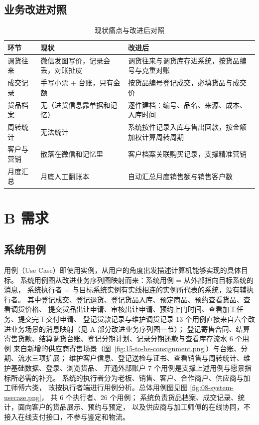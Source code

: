 \documentclass[12pt, a4paper]{ctexart}
\begin{document}
\subsection{业务改进对照}

\begin{table}[H]
\centering
\caption{现状痛点与改进后对照}
\begin{tabularx}{\textwidth}{@{}p{3.2cm} X X@{}}
\toprule
环节 & 现状 & 改进后 \\
\midrule
调货往来 & 微信发图写价，记录会丢，对账扯皮 & 调货往来与调货库存进系统，按货品编号与克重对账 \\
成交记录 & 手写小票 + 台账，只有金额 & 按货品编号登记成交，必填货品与成交价 \\
货品档案 & 无（进货信息靠单据和记忆） & 逐件建档：编号、品名、来源、成本、入库时间 \\
周转统计 & 无法统计 & 系统按件记录入库与售出回款，按金额加权计算周转周期 \\
客户与营销 & 散落在微信和记忆里 & 客户档案关联购买记录，支撑精准营销 \\
月度汇总 & 月底人工翻账本 & 自动汇总月度销售额与销售客户数 \\
\bottomrule
\end{tabularx}
\end{table}



\section{B 需求}

\subsection{系统用例}

用例（Use Case）即使用实例，从用户的角度出发描述计算机能够实现的具体目标。
系统用例图从改进业务序列图映射而来：系统用例 = 从外部指向目标系统的消息，
系统执行者 = 与目标系统实例有实线相连的实例所代表的系统，没有辅执行者。
其中登记成交、登记退货、登记货品入库、预定商品、预约查看货品、查看调货价格、
提交货品出让申请、审核出让申请、预约上门时间、查看加工任务、提交完工交付申请、
登记货款记录与维护调货记录 13 个用例直接来自六个改进业务场景的消息映射（见 A 部分改进业务序列图一节）；
登记寄售合同、结算寄售货款、结算调货台账、登记分期计划、记录分期还款与查看库存流水 6 个用例
来自新增的供应商寄售场景（图~\ref{fig:15-to-be-consignment.png}）与台账、分期、流水三项扩展；
维护客户信息、登记送检与证书、查看销售与周转统计、维护基础数据、登录、浏览货品、
开通外部账户 7 个用例是支撑上述用例与愿景指标所必需的补充。
系统的执行者分为老板、销售、客户、合作商户、供应商与加工师傅六类，
故按执行者端进行用例分析。总体用例图见图 \ref{fig:08-system-usecase.png}，
共 6 个执行者、26 个用例；
系统负责货品档案、成交记录、统计，面向客户的货品展示、预约与预定，
以及供应商与加工师傅的在线协同，不接入在线支付接口，不参与鉴定和物流。
\end{document}
